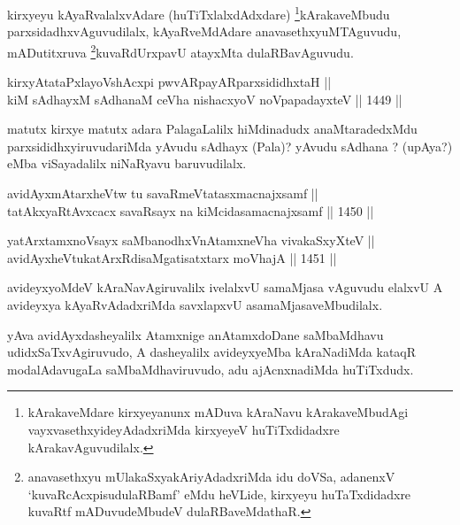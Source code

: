 \begin{artha}
kirxyeyu kAyaRvalalxvAdare (huTiTxlalxdAdxdare) \footnote{kArakaveMdare kirxyeyanunx mADuva kAraNavu kArakaveMbudAgi vayxvasethxyideyAdadxriMda kirxyeyeV huTiTxdidadxre kArakavAguvudilalx.}kArakaveMbudu parxsidadhxvAguvudilalx, kAyaRveMdAdare anavasethxyuMTAguvudu, mADutitxruva \footnote{anavasethxyu mUlakaSxyakAriyAdadxriMda idu doVSa, adanenxV `kuvaRcAcxpisudulaRBamf' eMdu heVLide, kirxyeyu huTaTxdidadxre kuvaRtf mADuvudeMbudeV dulaRBaveMdathaR.}kuvaRdUrxpavU atayxMta dulaRBavAguvudu.
\end{artha}

\begin{shl}
kirxyAtataPxlayoVshAcxpi pwvARpayARparxsididhxtaH ||  \\
kiM sAdhayxM sAdhanaM ceVha nishacxyoV noVpapadayxteV ||  1449 ||  
\end{shl}

\begin{artha}
matutx kirxye matutx adara PalagaLalilx hiMdinadudx anaMtaradedxMdu parxsididhxyiruvudariMda yAvudu sAdhayx (Pala)? yAvudu sAdhana ? (upAya?) eMba viSayadalilx niNaRyavu baruvudilalx.
\end{artha}


\begin{shl}
avidAyxmAtarxheVtw tu savaRmeVtatasxmacnajxsamf || \\
tatAkxyaRtAvxcacx savaRsayx na kiMcidasamacnajxsamf ||  1450 ||  
\end{shl}
				
\begin{shl}
yatArx\s \s tamxnoV\s sayx saMbanodhxV\s nAtamxneVha vivakaSxyXteV || \\
avidAyxheVtukatArxRdisaMgatisatxtarx moVhajA ||  1451 ||  
\end{shl}

\begin{artha}
avideyxyoMdeV kAraNavAgiruvalilx ivelalxvU samaMjasa vAguvudu elalxvU A avideyxya kAyaRvAdadxriMda savxlapxvU asamaMjasaveMbudilalx.
\end{artha}

\begin{artha}
yAva avidAyxdasheyalilx Atamxnige anAtamxdoDane saMbaMdhavu udidxSaTxvAgiruvudo, A dasheyalilx avideyxyeMba kAraNadiMda kataqR modalAdavugaLa saMbaMdhaviruvudo, adu ajAcnxnadiMda huTiTxdudx.
\end{artha}

